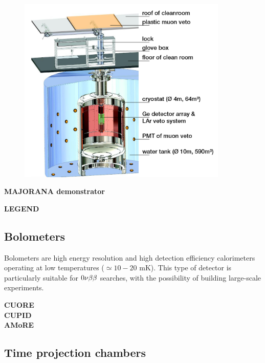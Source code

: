 \begin{figure}
  \centering
  \includegraphics[width=10cm]{0nubbexperiments/fig_0nubbexperiments/GERDA.png}
  \caption{\label{fig:GERDA}}

\end{figure}


\textbf{MAJORANA demonstrator}

\textbf{LEGEND}
\subsection{Bolometers}
\label{subsec:bolometers}

Bolometers are high energy resolution and high detection efficiency calorimeters operating at low temperatures ($\simeq 10-20$ mK).
This type of detector is particularly suitable for $0\nu\beta\beta$ searches, with the possibility of building large-scale experiments.

\textbf{CUORE}\\
\textbf{CUPID}\\
\textbf{AMoRE}
\subsection{Time projection chambers}
\label{subsec:TPC}

